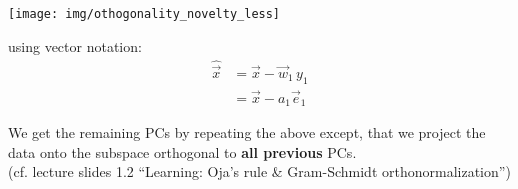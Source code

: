 \begin{frame}


\begin{center}
\texttt{[image: img/othogonality\_novelty\_less]}
\end{center}

\notesonly{\label{eq:projorth} }using vector notation:
\begin{align}
\hat {\vec x} &= \vec x - \vec w_1 \, y_1\\
			&= \vec x - a_1 \vec e_1
\end{align}

\pause

We get the remaining PCs by repeating the above except, that we project 
the data onto the subspace orthogonal to \textbf{all previous} PCs.\\
(cf. lecture slides 1.2 ``Learning: Oja's rule \& Gram-Schmidt orthonormalization'')

\end{frame}


